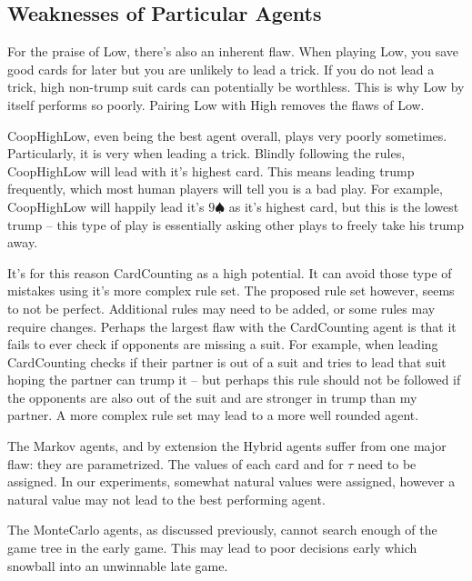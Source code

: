 \subsection{Weaknesses of Particular Agents}

For the praise of Low, there's also an inherent flaw. When playing Low, you save good cards for later but you are unlikely to lead a trick.
If you do not lead a trick, high non-trump suit cards can potentially be worthless. This is why Low by itself performs so poorly. Pairing
Low with High removes the flaws of Low.

CoopHighLow, even being the best agent overall, plays very poorly sometimes. Particularly, it is very when leading a trick. Blindly following
the rules, CoopHighLow will lead with it's highest card. This means leading trump frequently, which most human players will tell you is a bad play.
For example, CoopHighLow will happily lead it's $9\spadesuit$ as it's highest card, but this is the lowest trump -- this type of play is essentially
asking other plays to freely take his trump away.

It's for this reason CardCounting as a high potential. It can avoid those type of mistakes using it's more complex rule set. The proposed rule set
however, seems to not be perfect. Additional rules may need to be added, or some rules may require changes. Perhaps the largest flaw with the
CardCounting agent is that it fails to ever check if opponents are missing a suit. For example, when leading CardCounting checks if their partner
is out of a suit and tries to lead that suit hoping the partner can trump it -- but perhaps this rule should not be followed if the opponents are also
out of the suit and are stronger in trump than my partner. A more complex rule set may lead to a more well rounded agent.

The Markov agents, and by extension the Hybrid agents suffer from one major flaw: they are parametrized. The values of each card and for $\tau$
need to be assigned. In our experiments, somewhat natural values were assigned, however a natural value may not lead to the best performing agent.

The MonteCarlo agents, as discussed previously, cannot search enough of the game tree in the early game. This may lead to poor decisions early
which snowball into an unwinnable late game.

